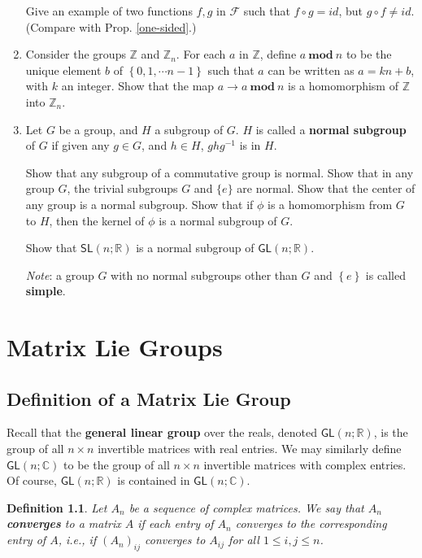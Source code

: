 \documentclass[12pt]{amsbook}
\theoremstyle{plain}
\newtheorem{definition}[theorem]{Definition}
\numberwithin{equation}{chapter}
\numberwithin{theorem}{chapter}
\begin{document}
\begin{enumerate}
Give an example of two functions $f,g$ in $\mathcal{F}$ such that $f\circ
g=id$, but $g\circ f\neq id$. (Compare with Prop. \ref{one-sided}.)

\item \label{zmodn}Consider the groups $\mathbb{Z}$ and $\mathbb{Z}_{n}$. For
each $a$ in $\mathbb{Z}$, define $a\ \mathbf{mod\ }n$ to be the unique element
$b$ of $\left\{  0,1,\cdots n-1\right\}  $ such that $a$ can be written as
$a=kn+b$, with $k$ an integer. Show that the map $a\rightarrow
a\ \mathbf{mod\ }n$ is a homomorphism of $\mathbb{Z}$ into $\mathbb{Z}_{n}$.

\item  Let $G$ be a group, and $H$ a subgroup of $G$. $H$ is called a
\textbf{normal subgroup} of $G$ if given any $g\in G$, and $h\in H$,
$ghg^{-1}$ is in $H$.

Show that any subgroup of a commutative group is normal. Show that in any
group $G$, the trivial subgroups $G$ and $\{e\}$ are normal. Show that the
center of any group is a normal subgroup. Show that if $\phi$ is a
homomorphism from $G$ to $H$, then the kernel of $\phi$ is a normal subgroup
of $G$.

Show that $\mathsf{SL}(n;\mathbb{R})$ is a normal subgroup of $\mathsf{GL}%
(n;\mathbb{R})$.

\textit{Note}: a group $G$ with no normal subgroups other than $G$ and
$\left\{  e\right\}  $ is called \textbf{simple}.
\end{enumerate}

\chapter{Matrix Lie Groups}

\section{Definition of a Matrix Lie Group}

Recall that the \textbf{general linear group} over the reals, denoted
$\mathsf{GL}(n;\mathbb{R})$, is the group of all $n\times n$ invertible
matrices with real entries. We may similarly define $\mathsf{GL}%
(n;\mathbb{C})$ to be the group of all $n\times n$ invertible matrices with
complex entries. Of course, $\mathsf{GL}(n;\mathbb{R})$ is contained in
$\mathsf{GL}(n;\mathbb{C})$.

\begin{definition}
\label{matrix.converge}Let $A_{n}$ be a sequence of complex matrices. We say
that $A_{n}$ \textbf{converges} to a matrix $A$ if each entry of $A_{n}$
converges to the corresponding entry of $A$, i.e., if $\left(  A_{n}\right)
_{ij}$ converges to $A_{ij}$ for all $1\leq i,j\leq n$.
\end{definition}
\end{document}
